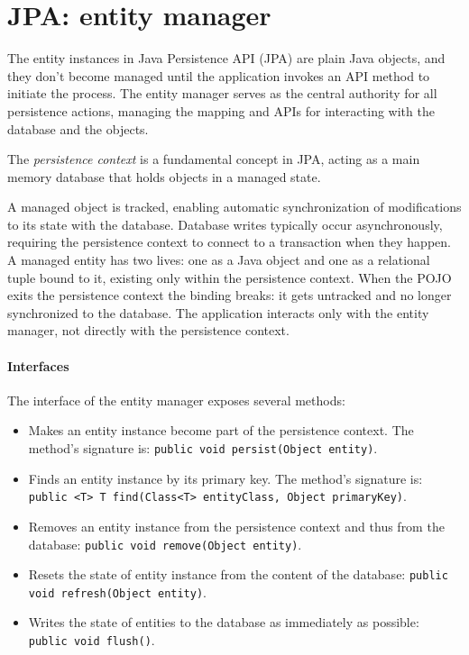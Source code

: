 \section{JPA: entity manager}

The entity instances in Java Persistence API (JPA) are plain Java objects, and they don't become managed until the application invokes an API method to initiate the process. 
The entity manager serves as the central authority for all persistence actions, managing the mapping and APIs for interacting with the database and the objects.
\begin{definition}
    The \emph{persistence context} is a fundamental concept in JPA, acting as a main memory database that holds objects in a managed state.
\end{definition}
A managed object is tracked, enabling automatic synchronization of modifications to its state with the database.
Database writes typically occur asynchronously, requiring the persistence context to connect to a transaction when they happen. 
A managed entity has two lives: one as a Java object and one as a relational tuple bound to it, existing only within the persistence context.
When the POJO exits the persistence context the binding breaks: it gets untracked and no longer synchronized to the database.
The application interacts only with the entity manager, not directly with the persistence context.

\paragraph*{Interfaces}
The interface of the entity manager exposes several methods:
\begin{itemize}
    \item Makes an entity instance become part of the persistence context. 
        The method's signature is: \texttt{public void persist(Object entity)}. 
    \item Finds an entity instance by its primary key. 
        The method's signature is: \texttt{public <T> T find(Class<T> entityClass, Object primaryKey)}.
    \item Removes an entity instance from the persistence context and thus from the database: \texttt{public void remove(Object entity)}.
    \item Resets the state of entity instance from the content of the database: \texttt{public void refresh(Object entity)}.
    \item Writes the state of entities to the database as immediately as possible: \texttt{public void flush()}.
\end{itemize}

